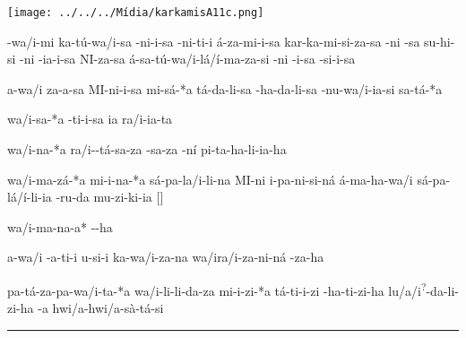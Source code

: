 \clearpage

\begin{center}
	\texttt{[image: ../../../Mídia/karkamisA11c.png]}
\end{center}

\clearpage

\setcounter{parcount}{0}
\begin{parnumbersa}[]

	\raggedright%
	\itshape%

	-wa/i-mi \spac{}ka-tú-wa/i-sa -ni-i-sa
	-ni-ti-i á-za-mi-i-sa
	kar-ka-mi-si-za-sa \lmasc{}-ni -sa
	\spac{}su-hi-si \lmasc{}-ni -ia-i-sa
	\lmasc{}NI-za-sa \spac{}á-sa-tú-wa/i-lá/í-ma-za-si -ni -i-sa \lmasc{}-si-i-sa

	a-wa/i za-a-sa MI-ni-i-sa mi-sá-*a \lmasc{}tá-da-li-sa
	-ha-da-li-sa \lbreak{} \spac{}-nu-wa/i-ia-si sa-tá-*a

	wa/i-sa-*a -ti-i-sa \lmasc{} ia\logo{+} ra/i-ia-ta

	wa/i-na-*a \spac{}ra/i--tá-sa-za \lmasc{}-sa-za -ní \lmasc{}pi-ta-ha-li-ia-ha

	wa/i-ma-zá-*a mi-i-na-*a \lmasc{}sá-pa-la/i-li-na \lmasc{}MI-ni i-pa-ni-si-ná \lmasc{}á-ma-ha-wa/i \lmasc{}sá-pa-lá/í-li-ia -ru-da mu-zi-ki-ia \lmasc{}$[$\logo{\ldots{}}$]$ \lbreak{}

	wa/i-ma-na-a* \lmasc{}--ha

	a-wa/i \lmasc{}-a-ti-i \lmasc{}u-si-i
	ka-wa/i-za-na \lmasc{}wa/i\logo{+}ra/i-za-ni-ná
	\lmasc{}-za-ha

	pa-tá-za-pa-wa/i-ta-*a wa/i-li-li-da-za mi-i-zi-*a
	\lmasc{}tá-ti-i-zi -ha-ti-zi-ha
	\lmasc{}lu/a/i\textsuperscript{?}-da-li-zi-ha
	\lmasc{}-a hwi/a-hwi/a-sà-tá-si


\end{parnumbersa}

\vspace{10pt}
\hrule
\vspace{10pt}


